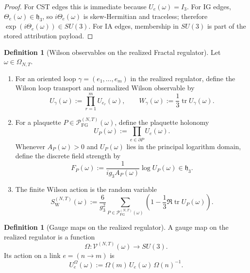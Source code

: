 \documentclass[11pt]{article}
\theoremstyle{definition}
\newtheorem{definition}[theorem]{Definition}
\theoremstyle{remark}
\newcommand{\mcP}{\mathcal P}
\newcommand{\mcV}{\mathcal V}
\newcommand{\tr}{\operatorname{tr}}
\newcommand{\mathfrakh}{\mathfrak h_3}
\begin{document}
\begin{proof}
For CST edges this is immediate because \(U_e(\omega)=I_3\). For IG edges,
\(\Theta_e(\omega)\in\mathfrakh\), so \(i\Theta_e(\omega)\) is skew-Hermitian
and traceless; therefore \(\exp(i\Theta_e(\omega))\in SU(3)\). For IA edges,
membership in \(SU(3)\) is part of the stored attribution payload.
\end{proof}

\begin{definition}[Wilson observables on the realized Fractal regulator]
\label{def:realized-wilson-observables}
Let \(\omega\in\Omega_{N,T}\).
\begin{enumerate}[leftmargin=1.5em,label=\textnormal{(\roman*)}]
\item For an oriented loop \(\gamma=(e_1,\dots,e_m)\) in the realized regulator,
define the Wilson loop transport and normalized Wilson observable by
\[
U_\gamma(\omega):=\prod_{r=1}^m U_{e_r}(\omega),
\qquad
W_\gamma(\omega):=\frac13\tr U_\gamma(\omega).
\]
\item For a plaquette \(P\in\mcP_{\mathrm{FG}}^{(N,T)}(\omega)\), define the
plaquette holonomy
\[
U_P(\omega):=\prod_{e\in\partial P}U_e(\omega).
\]
Whenever \(A_P(\omega)>0\) and \(U_P(\omega)\) lies in the principal logarithm
domain, define the discrete field strength by
\[
F_P(\omega):=\frac{1}{ig_3A_P(\omega)}\log U_P(\omega)\in\mathfrakh.
\]
\item The finite Wilson action is the random variable
\[
S_{\mathrm W}^{(N,T)}(\omega)
:=
\frac{6}{g_3^2}
\sum_{P\in\mcP_{\mathrm{FG}}^{(N,T)}(\omega)}
\left(
1-\frac13\Re\tr U_P(\omega)
\right).
\]
\end{enumerate}
\end{definition}

\begin{definition}[Gauge maps on the realized regulator]
\label{def:realized-gauge-map}
A gauge map on the realized regulator is a function
\[
\Omega:\mcV^{(N,T)}(\omega)\to SU(3).
\]
Its action on a link \(e=(n\to m)\) is
\[
U_e^\Omega(\omega):=
\Omega(m)\,U_e(\omega)\,\Omega(n)^{-1}.
\]
\end{definition}
\end{document}
